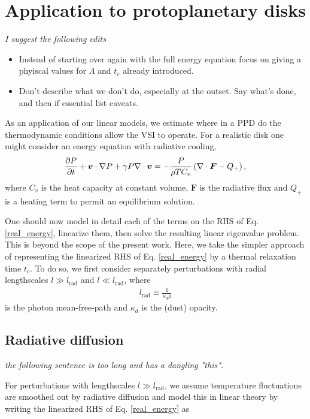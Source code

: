 \section{Application to protoplanetary disks}\label{application} 
\emph{I suggest the following edits}
\begin{itemize}
\item Instead of starting over again with the full energy equation focus on giving a phyiscal values for $\Lambda$ and $t_c$ already introduced.
\item Don't describe what we don't do, especially at the outset.  Say what's done, and then if essential list caveats.
\end{itemize}


As an application of our linear models, we estimate where in a
PPD do the thermodynamic conditions allow the VSI to
operate. For a realistic disk one might consider an energy equation
with radiative cooling, 
\begin{align}\label{real_energy}
  \frac{\partial P}{\partial t} + \bm{v}\cdot\nabla P +\gamma P \nabla\cdot\bm{v} = - \frac{P}{\rho T
    C_v}\left(\nabla\cdot\bm{F} - Q_+\right), 
\end{align}
where $C_v$ is the heat capacity at constant
volume, 
$\bm{F}$ is the radiative flux and $Q_+$ is a heating
term to permit an equilibrium solution. 

One should now model in detail each of the terms on the RHS of
Eq. \ref{real_energy}, linearize them, then solve 
the resulting linear eigenvalue problem. This is beyond 
the scope of the present work. Here, we take the simpler approach of
representing the linearized RHS of Eq. \ref{real_energy} by a thermal
relaxation time $t_c$. To do so, we first consider separately
perturbations with radial lengthscales $l\gg l_\mathrm{rad}$ and  
$l\ll l_\mathrm{rad}$, where      
\begin{align}\label{lrad}
  l_\mathrm{rad} \equiv \frac{1}{\kappa_d\rho} 
\end{align} 
is the photon mean-free-path and $\kappa_d$ is the (dust) opacity. 

\subsection{Radiative diffusion}
\emph{the following sentence is too long and has a dangling "this".}

For perturbations with lengthscales $l\gg
l_\mathrm{rad}$, we assume temperature fluctuations are smoothed out
by radiative diffusion and model this in linear theory by writing the
linearized RHS of Eq. \ref{real_energy} as 

